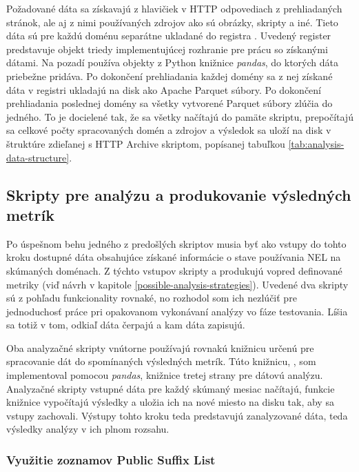 Požadované dáta sa získavajú z hlavičiek v HTTP odpovediach z prehliadaných stránok, ale aj z nimi používaných zdrojov ako sú obrázky, skripty a iné.
Tieto dáta sú pre každú doménu separátne ukladané do registra .
Uvedený register predstavuje objekt triedy implementujúcej rozhranie pre prácu so získanými dátami. 
Na pozadí používa  objekty z Python knižnice \textit{pandas}, do ktorých dáta priebežne pridáva.
Po dokončení prehliadania každej domény sa z nej získané dáta v registri ukladajú na disk ako Apache Parquet súbory.
Po dokončení prehliadania poslednej domény sa všetky vytvorené Parquet súbory zlúčia do jedného.
To je docielené tak, že sa všetky načítajú do pamäte skriptu, prepočítajú sa celkové počty spracovaných domén a zdrojov a výsledok sa uloží na disk v štruktúre zdieľanej s HTTP Archive skriptom, popísanej tabuľkou \ref{tab:analysis-data-structure}.

\subsection{Skripty pre analýzu a produkovanie výsledných metrík}
\label{analyze_results}

Po úspešnom behu jedného z predošlých skriptov musia byť ako vstupy do tohto kroku dostupné dáta obsahujúce získané informácie o stave používania NEL na skúmaných doménach.
Z týchto vstupov skripty  a  produkujú vopred definované metriky (viď návrh v kapitole \ref{possible-analysis-strategies}).
Uvedené dva skripty sú z pohľadu funkcionality rovnaké, no rozhodol som ich nezlúčiť pre jednoduchosť práce pri opakovanom vykonávaní analýzy vo fáze testovania.
Líšia sa totiž v tom, odkiaľ dáta čerpajú a kam dáta zapisujú.

Oba analyzačné skripty vnútorne používajú rovnakú knižnicu určenú pre spracovanie dát do spomínaných výsledných metrík.
Túto knižnicu, , som implementoval pomocou \textit{pandas}, knižnice tretej strany pre dátovú analýzu.
Analyzačné skripty vstupné dáta pre každý skúmaný mesiac načítajú, funkcie knižnice vypočítajú výsledky a uložia ich na nové miesto na disku tak, aby sa vstupy zachovali.
Výstupy tohto kroku teda predstavujú zanalyzované dáta, teda výsledky analýzy v ich plnom rozsahu.

\subsubsection{Využitie zoznamov Public Suffix List}

